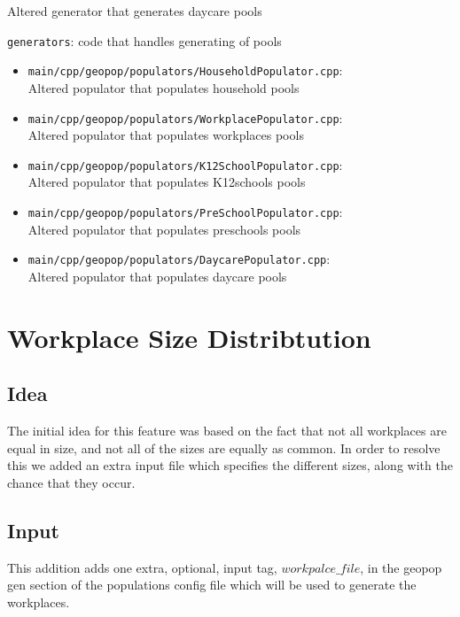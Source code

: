 \begin{compactitem}
\begin{itemize}
		Altered generator that generates daycare pools
	\end{itemize}
	\item \texttt{generators}: code that handles generating of pools
	\begin{itemize}
		\item \texttt{main/cpp/geopop/populators/HouseholdPopulator.cpp}:\\
		Altered populator that populates household pools
		\item \texttt{main/cpp/geopop/populators/WorkplacePopulator.cpp}:\\
		Altered populator that populates workplaces pools
		\item \texttt{main/cpp/geopop/populators/K12SchoolPopulator.cpp}:\\
		Altered populator that populates K12schools pools
		\item \texttt{main/cpp/geopop/populators/PreSchoolPopulator.cpp}:\\
		Altered populator that populates preschools pools
		\item \texttt{main/cpp/geopop/populators/DaycarePopulator.cpp}:\\
		Altered populator that populates daycare pools
	\end{itemize}
\end{compactitem}


\section{Workplace Size Distribtution}
\label{section:WorkplaceSizeDistribution}

\subsection{Idea}
The initial idea for this feature was based on the fact that not all workplaces are equal in size, and not all of the sizes are equally as common. In order to resolve this we added an extra input file which specifies the different sizes, along with the chance that they occur.

\subsection{Input}
This addition adds one extra, optional, input tag, $workpalce\_file$, in the geopop gen section of the populations config file which will be used to generate the workplaces.

